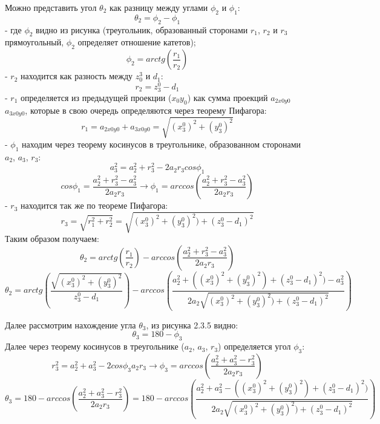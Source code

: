 \begin{enumerate}
Можно представить угол $\theta_2$ как разницу между углами $\phi_2$ и $\phi_1$:\\
$$\theta_2 = \phi_2 - \phi_1$$
- где $\phi_2$ видно из рисунка (треугольник, образованный сторонами $r_1$, $r_2$ и $r_3$ прямоугольный, $\phi_2$ определяет отношение катетов);
$$\phi_2 = arctg(\frac{r_1}{r_2})$$
- $r_2$ находится как разность между $z_0^3$ и $d_1$: \\
$$r_2=z_3^0 - d_1$$
- $r_1$ определяется из предыдущей проекции ($x_0y_0$) как сумма проекций $a_{2x0y0}$ $a_{3x0y0}$, которые в свою очередь определяются через теорему Пифагора:\\ $$r_1=a_{2x0y0}+a_{3x0y0}=\sqrt{(x_3^0)^2+(y_3^0)^2}$$
- $\phi_1$ находим через теорему косинусов в треугольнике, образованном сторонами $a_2$, $a_3$, $r_3$:\\
$$a_3^2 = a_2^2 + r_3^2 - 2 a_2 r_3 cos\phi_1$$
$$cos\phi_1 = \frac{a_2^2 + r_3^2 - a_3^2}{2 a_2 r_3} \rightarrow \phi_1 = arccos(\frac{a_2^2 + r_3^2 - a_3^2}{2 a_2 r_3})$$
- $r_3$ находится так же по теореме Пифагора:\\
$$r_3=\sqrt{r_1^2+r_2^2}=\sqrt{(x_3^0)^2+(y_3^0)^2)+(z_3^0 - d_1)^2}$$
Таким образом получаем:\\
$$\theta_2=arctg(\frac{r_1}{r_2}) - arccos(\frac{a_2^2 + r_3^2 - a_3^2}{2 a_2 r_3})$$
$$ \theta_2=arctg(\frac{\sqrt{(x_3^0)^2+(y_3^0)^2}}{z_3^0-d_1}) - arccos(\frac{a_2^2 + ((x_3^0)^2+(y_3^0)^2)+(z_3^0 - d_1)^2) - a_3^2}{2 a_2 \sqrt{(x_3^0)^2+(y_3^0)^2)+(z_3^0 - d_1)^2}}) $$

Далее рассмотрим нахождение угла $\theta_3$, из рисунка 2.3.5 видно:
$$\theta_3=180-\phi_3$$
Далее через теорему косинусов в треугольнике ($a_2$, $a_3$, $r_3$) определяется угол $\phi_3$:\\
$$r_3^2=a_2^2+a_3^2 - 2cos\phi_3 a_2 r_3 \rightarrow \phi_3 = arccos(\frac{a_2^2 + a_3^2 -r_3^2}{2a_2 r_3})$$
$$\theta_3=180-arccos(\frac{a_2^2 + a_3^2 -r_3^2}{2a_2 r_3})=180-arccos(\frac{a_2^2 + a_3^2 -((x_3^0)^2+(y_3^0)^2)+(z_3^0 - d_1)^2)}{2a_2 \sqrt{(x_3^0)^2+(y_3^0)^2)+(z_3^0 - d_1)^2}})$$

 \end{enumerate}